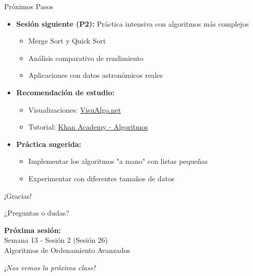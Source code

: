 \documentclass[10pt]{beamer}
\begin{document}
\begin{frame}{Próximos Pasos}
  \begin{itemize}
    \item \textbf{Sesión siguiente (P2):} Práctica intensiva con algoritmos más complejos
      \begin{itemize}
        \item Merge Sort y Quick Sort
        \item Análisis comparativo de rendimiento
        \item Aplicaciones con datos astronómicos reales
      \end{itemize}
    \item \textbf{Recomendación de estudio:}
      \begin{itemize}
        \item Visualizaciones: \href{https://visualgo.net}{VisuAlgo.net}
        \item Tutorial: \href{https://www.khanacademy.org/computing/computer-science/algorithms}{Khan Academy - Algoritmos}
      \end{itemize}
    \item \textbf{Práctica sugerida:}
      \begin{itemize}
        \item Implementar los algoritmos "a mano" con listas pequeñas
        \item Experimentar con diferentes tamaños de datos
      \end{itemize}
  \end{itemize}
\end{frame}

\begin{frame}{¡Gracias!}
  \begin{center}
    \Large
    ¿Preguntas o dudas?
    
    \vspace{1cm}
    \normalsize
    \textbf{Próxima sesión:}\\
    Semana 13 - Sesión 2 (Sesión 26)\\
    Algoritmos de Ordenamiento Avanzados
    
    \vspace{0.5cm}
    \textit{¡Nos vemos la próxima clase!}
  \end{center}
\end{frame}
\end{document}
